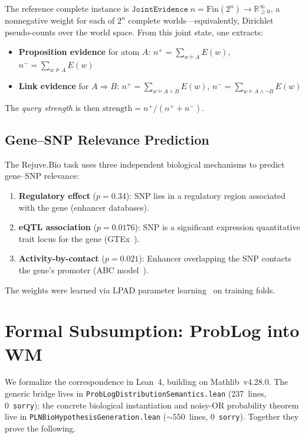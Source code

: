 \documentclass[]{article}
\newcommand{\code}[1]{\texttt{#1}}
\newcommand{\ty}[1]{\ensuremath{\mathtt{#1}}}
\newcommand{\JointEvidence}{\ty{JointEvidence}}
\newcommand{\nplus}{\ensuremath{n^{+}}}
\newcommand{\nminus}{\ensuremath{n^{-}}}
\begin{document}
The reference complete instance is $\JointEvidence\;n = \mathrm{Fin}(2^n) \to \mathbb{R}_{\geq 0}^{\infty}$,
a nonneg\-ative weight for each of $2^n$ complete worlds---equivalently, Dirichlet
pseudo-counts over the world space.  From this joint state, one extracts:
\begin{itemize}
\item \textbf{Proposition evidence} for atom $A$: $\nplus = \sum_{w \models A} E(w)$,\;
  $\nminus = \sum_{w \not\models A} E(w)$
\item \textbf{Link evidence} for $A \Rightarrow B$: $\nplus = \sum_{w \models A \wedge B} E(w)$,\;
  $\nminus = \sum_{w \models A \wedge \neg B} E(w)$
\end{itemize}
The \emph{query strength} is then $\text{strength} = \nplus / (\nplus + \nminus)$.

\subsection{Gene--SNP Relevance Prediction}

The Rejuve.Bio task uses three independent biological mechanisms to predict
gene--SNP relevance:
\begin{enumerate}
\item \textbf{Regulatory effect} ($p = 0.34$): SNP lies in a regulatory region
  associated with the gene (enhancer databases).
\item \textbf{eQTL association} ($p = 0.0176$): SNP is a significant expression
  quantitative trait locus for the gene (GTEx~\cite{GTEx2020}).
\item \textbf{Activity-by-contact} ($p = 0.021$): Enhancer overlapping the SNP
  contacts the gene's promoter (ABC model~\cite{Nasser2021ABC}).
\end{enumerate}
The weights were learned via LPAD parameter learning~\cite{Riguzzi2018} on training
folds.

\section{Formal Subsumption: ProbLog into WM}
\label{sec:formal}

We formalize the correspondence in Lean~4, building on Mathlib~v4.28.0.
The generic bridge lives in \code{ProbLogDistributionSemantics.lean} (237~lines,
0~\code{sorry}); the concrete biological instantiation and noisy-OR probability
theorem live in \code{PLNBioHypothesisGeneration.lean} (${\sim}550$~lines,
0~\code{sorry}).  Together they prove the following.
\end{document}
